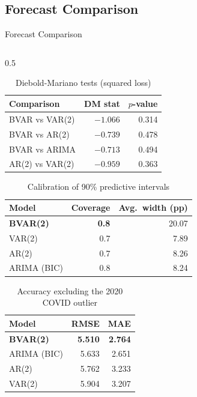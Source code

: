 \documentclass[9pt]{beamer}
\begin{document}
\subsection{Forecast Comparison}
\begin{frame}{Forecast Comparison}\label{slide15}

\small

\begin{columns}
  \begin{column}{0.5\textwidth}
\vspace{-0.2cm}
    \begin{table}[ht]
    \tiny
    \centering
    \caption{\footnotesize Diebold-Mariano tests (squared loss)}
    \begin{tabular}{lrr}
    \toprule
    \textbf{Comparison} & \textbf{DM stat} & \textbf{$p$-value} \\
    \midrule
    BVAR vs VAR(2)  & $-1.066$ & 0.314 \\
    BVAR vs AR(2)   & $-0.739$ & 0.478 \\
    BVAR vs ARIMA   & $-0.713$ & 0.494 \\
    AR(2) vs VAR(2) & $-0.959$ & 0.363 \\
    \bottomrule
    \end{tabular}
    \end{table}
\vspace{-0.3cm}
    \begin{table}[ht]
    \tiny
    \centering
    \caption{\footnotesize Calibration of 90\% predictive intervals}
    \begin{tabular}{lrr}
    \toprule
    \textbf{Model} & \textbf{Coverage} & \textbf{Avg.\ width (pp)} \\
    \midrule
    \textbf{BVAR(2)} & \textbf{0.8} & 20.07 \\
    VAR(2)           & 0.7          &  7.89 \\
    AR(2)            & 0.7          &  8.26 \\
    ARIMA (BIC)      & 0.8          &  8.24 \\
    \bottomrule
    \end{tabular}
    \end{table}
\vspace{-0.3cm}
    \begin{table}[ht]
    \tiny
    \centering
    \caption{\footnotesize Accuracy excluding the 2020 COVID outlier}
    \begin{tabular}{lrr}
    \toprule
    \textbf{Model} & \textbf{RMSE} & \textbf{MAE} \\
    \midrule
    \textbf{BVAR(2)} & \textbf{5.510} & \textbf{2.764} \\
    ARIMA (BIC)      & 5.633 & 2.651 \\
    AR(2)            & 5.762 & 3.233 \\
    VAR(2)           & 5.904 & 3.207 \\
    \bottomrule
    \end{tabular}
    \end{table}
  \end{column}


\end{columns}
\end{frame}
\end{document}
